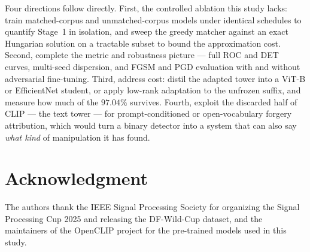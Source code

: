 \documentclass[10pt,journal]{IEEEtran}
\begin{document}
Four directions follow directly. First, the controlled ablation this study
lacks: train matched-corpus and unmatched-corpus models under identical
schedules to quantify Stage~1 in isolation, and sweep the greedy matcher
against an exact Hungarian solution on a tractable subset to bound the
approximation cost. Second, complete the metric and robustness picture --- full
ROC and DET curves, multi-seed dispersion, and FGSM and PGD evaluation with
and without adversarial fine-tuning. Third, address cost: distil the adapted
tower into a ViT-B or EfficientNet student, or apply low-rank adaptation to the
unfrozen suffix, and measure how much of the $97.04\%$ survives. Fourth,
exploit the discarded half of CLIP --- the text tower --- for prompt-conditioned
or open-vocabulary forgery attribution, which would turn a binary detector
into a system that can also say \emph{what kind} of manipulation it has found.

\section*{Acknowledgment}
The authors thank the IEEE Signal Processing Society for organizing the Signal
Processing Cup 2025 and releasing the DF-Wild-Cup dataset, and the maintainers
of the OpenCLIP project for the pre-trained models used in this study.



\end{document}
